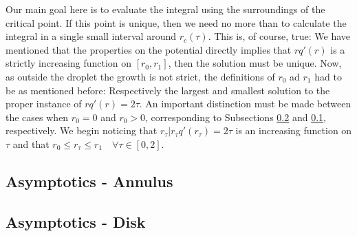 Our main goal here is to evaluate the integral using the surroundings of the critical point. If this point is unique, then we need no more than to calculate the integral in a single small interval around $r_c(\tau)$. This is, of course, true: We have mentioned that the properties on the potential directly implies that $r q'(r)$ is a strictly increasing function on $[r_0, r_1]$, then the solution must be unique. Now, as outside the droplet the growth is not strict, the definitions of $r_0$ ad $r_1$ had to be as mentioned before: Respectively the largest and smallest solution to the proper instance of $rq'(r) = 2\tau$. An important distinction must be made between the cases when $r_0 = 0$ and $r_0 > 0$, corresponding to Subsections \ref{Subsection: Disk} and \ref{Subsection: Annulus}, respectively.  We begin noticing that $r_\tau | r_\tau q'(r_\tau) = 2 \tau$ is an increasing function on $\tau$ and that $r_0 \leq r_\tau \leq r_1\quad \forall \tau \in [0,2]$. 

\subsection{Asymptotics - Annulus}
\label{Subsection: Annulus}



\subsection{Asymptotics - Disk}
\label{Subsection: Disk}


